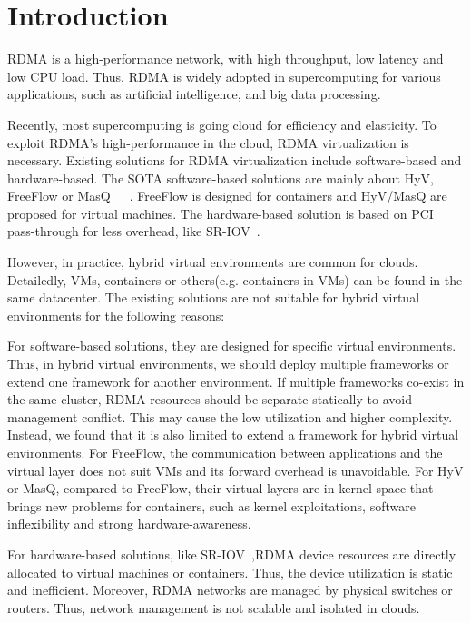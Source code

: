 \section{Introduction}
RDMA is a high-performance network,  with high throughput, low latency and low CPU load. Thus, RDMA is widely adopted in supercomputing for various applications,  such as artificial intelligence, and big data processing. 

Recently, most supercomputing is going cloud for efficiency and elasticity. To exploit RDMA’s high-performance in the cloud,  RDMA virtualization is necessary. Existing solutions for RDMA virtualization include software-based and  hardware-based. The SOTA software-based solutions are mainly about HyV, FreeFlow or MasQ~\cite{pfefferle2015hybrid}~\cite{kim2019freeflow}~\cite{he2020masq}. FreeFlow is  designed for containers and HyV/MasQ are proposed for virtual machines. The hardware-based solution is based on PCI pass-through for less overhead, like SR-IOV~\cite{sr-iov}. 

However, in practice, hybrid virtual environments are common for clouds. Detailedly, VMs, containers or others(e.g. containers in VMs) can be found in the same datacenter. The existing solutions are not suitable for hybrid virtual environments for the following reasons:

For software-based solutions, they are designed for specific virtual environments. Thus, in hybrid virtual environments, we should deploy multiple frameworks or extend one framework for another environment. If multiple frameworks co-exist in the same cluster, RDMA resources should be separate statically to avoid management conflict. This may cause the low utilization and higher complexity. Instead, we found that it is also limited to extend a framework for hybrid virtual environments. For FreeFlow,  the communication between applications and the virtual layer does not suit VMs and its forward overhead is unavoidable. For HyV or MasQ, compared to FreeFlow, their virtual layers are in kernel-space that brings new problems for containers, such as kernel exploitations, software inflexibility and strong hardware-awareness.

For hardware-based solutions, like SR-IOV~\cite{sr-iov},RDMA device resources are directly allocated to virtual machines or containers. Thus, the device utilization is static and inefficient. Moreover, RDMA networks are managed by physical switches or routers. Thus, network management is not scalable and isolated in clouds.

